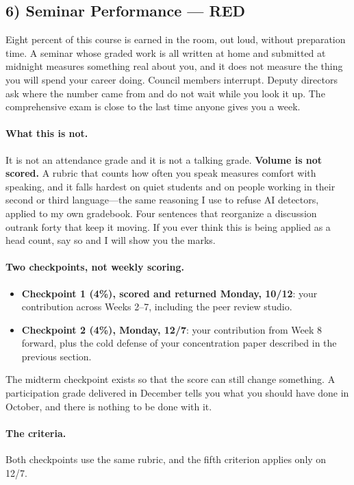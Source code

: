 \documentclass[11pt]{article}     %
\begin{document}
\subsection*{6) Seminar Performance --- RED}

Eight percent of this course is earned in the room, out loud, without preparation time. A seminar whose graded work is all written at home and submitted at midnight measures something real about you, and it does not measure the thing you will spend your career doing. Council members interrupt. Deputy directors ask where the number came from and do not wait while you look it up. The comprehensive exam is close to the last time anyone gives you a week.

\paragraph*{What this is not.} It is not an attendance grade and it is not a talking grade. \textbf{Volume is not scored.} A rubric that counts how often you speak measures comfort with speaking, and it falls hardest on quiet students and on people working in their second or third language---the same reasoning I use to refuse AI detectors, applied to my own gradebook. Four sentences that reorganize a discussion outrank forty that keep it moving. If you ever think this is being applied as a head count, say so and I will show you the marks.

\paragraph*{Two checkpoints, not weekly scoring.}
\begin{itemize}
    \item \textbf{Checkpoint 1 (4\%), scored and returned Monday, 10/12}: your contribution across Weeks 2--7, including the peer review studio.
    \item \textbf{Checkpoint 2 (4\%), Monday, 12/7}: your contribution from Week 8 forward, plus the cold defense of your concentration paper described in the previous section.
\end{itemize}

\noindent The midterm checkpoint exists so that the score can still change something. A participation grade delivered in December tells you what you should have done in October, and there is nothing to be done with it.

\paragraph*{The criteria.} Both checkpoints use the same rubric, and the fifth criterion applies only on 12/7.
\end{document}
